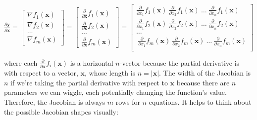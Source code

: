 \documentclass[11pt]{article}
\begin{document}
$
\frac{\partial \mathbf{y}}{\partial \mathbf{x}} = \begin{bmatrix}
\nabla f_1(\mathbf{x}) \\
\nabla f_2(\mathbf{x})\\
\ldots\\
\nabla f_m(\mathbf{x})
\end{bmatrix} = \begin{bmatrix}
\frac{\partial}{\partial \mathbf{x}} f_1(\mathbf{x}) \\
\frac{\partial}{\partial \mathbf{x}} f_2(\mathbf{x})\\
\ldots\\
\frac{\partial}{\partial \mathbf{x}} f_m(\mathbf{x})
\end{bmatrix} = \begin{bmatrix}
\frac{\partial}{\partial {x_1}} f_1(\mathbf{x})~ \frac{\partial}{\partial {x_2}} f_1(\mathbf{x}) ~\ldots~ \frac{\partial}{\partial {x_n}} f_1(\mathbf{x}) \\
\frac{\partial}{\partial {x_1}} f_2(\mathbf{x})~ \frac{\partial}{\partial {x_2}} f_2(\mathbf{x}) ~\ldots~ \frac{\partial}{\partial {x_n}} f_2(\mathbf{x}) \\
\ldots\\
~\frac{\partial}{\partial {x_1}} f_m(\mathbf{x})~ \frac{\partial}{\partial {x_2}} f_m(\mathbf{x}) ~\ldots~ \frac{\partial}{\partial {x_n}} f_m(\mathbf{x}) \\
\end{bmatrix}
$

where each $\frac{\partial}{\partial \mathbf{x}} f_i(\mathbf{x})$ is a horizontal $n$-vector because the partial derivative is with respect to a vector, $\mathbf{x}$, whose length is $n = |\mathbf{x}|$.  The width of the Jacobian is $n$ if we're taking the partial derivative with respect to $\mathbf{x}$ because there are $n$ parameters we can wiggle, each potentially changing the function's value. Therefore, the Jacobian is always $m$ rows for $n$ equations.  It helps to think about the possible Jacobian shapes visually:
\end{document}
